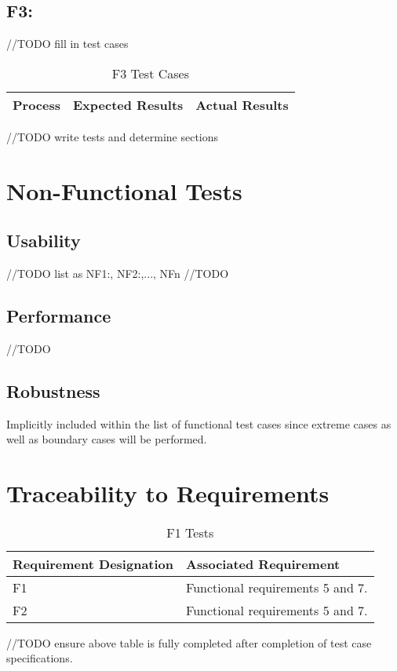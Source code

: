\documentclass[12pt, titlepage]{article}
\begin{document}
\subsection{F3: }
//TODO fill in test cases
\begin{table}[h!]
\centering
\begin{tabular}{| p{6cm} | p{5cm} | p{5cm} |}    \hline
	Process &Expected Results &Actual Results\\ \hline
\end{tabular}
\caption{F3 Test Cases}
\label{table:F3 Test Cases}
\end{table}

//TODO write tests and determine sections

\section{Non-Functional Tests}
\subsection{Usability}
//TODO list as NF1:, NF2:,..., NFn
//TODO
\subsection{Performance}
//TODO
\subsection{Robustness}
Implicitly included within the list of functional test cases since extreme cases as well as boundary cases will be performed.

\section{Traceability to Requirements}
\begin{table}[h!]
\centering
\begin{tabular}{| p{2.5cm} | p{8cm} |}    \hline
	Requirement Designation &Associated Requirement\\ \hline
	F1 &Functional requirements 5 and 7.\\ \hline
	F2 &Functional requirements 5 and 7.\\ \hline
\end{tabular}
\caption{F1 Tests}
\label{table:F1 Tests}
\end{table}
//TODO ensure above table is fully completed after completion of test case specifications.
\end{document}
